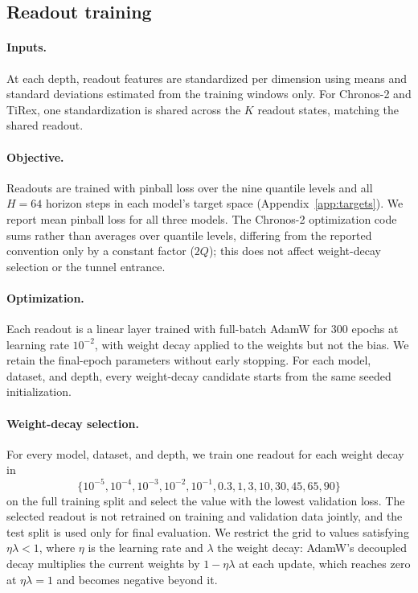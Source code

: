 \documentclass{article} %
\begin{document}
\subsection{Readout training}
\label{app:readout_training}

\paragraph{Inputs.}
At each depth, readout features are standardized per dimension using means and standard
deviations estimated from the training windows only. For Chronos-2 and TiRex, one
standardization is shared across the $K$ readout states, matching the shared readout.

\paragraph{Objective.}
Readouts are trained with pinball loss over the nine quantile levels and all $H=64$ horizon
steps in each model's target space (Appendix~\ref{app:targets}). We report mean pinball loss for
all three models. The Chronos-2 optimization code sums rather than averages over quantile
levels, differing from the reported convention only by a constant factor ($2Q$); this does not
affect weight-decay selection or the tunnel entrance.

\paragraph{Optimization.}
Each readout is a linear layer trained with full-batch AdamW for 300 epochs at learning rate
$10^{-2}$, with weight decay applied to the weights but not the bias. We retain the final-epoch
parameters without early stopping. For each model, dataset, and depth, every weight-decay
candidate starts from the same seeded initialization.

\paragraph{Weight-decay selection.}
For every model, dataset, and depth, we train one readout for each weight decay in
\[
\{10^{-5},10^{-4},10^{-3},10^{-2},10^{-1},0.3,1,3,10,30,45,65,90\}
\]
on the full training split and select the value with the lowest validation loss. The selected
readout is not retrained on training and validation data jointly, and the test split is used
only for final evaluation. We restrict the grid to values satisfying $\eta\lambda<1$, where
$\eta$ is the learning rate and $\lambda$ the weight decay: AdamW's decoupled decay multiplies
the current weights by $1-\eta\lambda$ at each update, which reaches zero at $\eta\lambda=1$ and
becomes negative beyond it.
\end{document}
